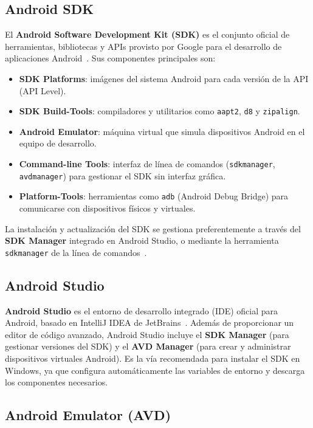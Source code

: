 \documentclass[12pt,a4paper]{article}
\begin{document}
\subsection{Android SDK}

El \textbf{Android Software Development Kit (SDK)} es el conjunto oficial de herramientas, bibliotecas y APIs provisto por Google para el desarrollo de aplicaciones Android~\cite{androiddev2024}. Sus componentes principales son:

\begin{itemize}
  \item \textbf{SDK Platforms}: imágenes del sistema Android para cada versión de la API (API Level).
  \item \textbf{SDK Build-Tools}: compiladores y utilitarios como \texttt{aapt2}, \texttt{d8} y \texttt{zipalign}.
  \item \textbf{Android Emulator}: máquina virtual que simula dispositivos Android en el equipo de desarrollo.
  \item \textbf{Command-line Tools}: interfaz de línea de comandos (\texttt{sdkmanager}, \texttt{avdmanager}) para gestionar el SDK sin interfaz gráfica.
  \item \textbf{Platform-Tools}: herramientas como \texttt{adb} (Android Debug Bridge) para comunicarse con dispositivos físicos y virtuales.
\end{itemize}

La instalación y actualización del SDK se gestiona preferentemente a través del \textbf{SDK Manager} integrado en Android Studio, o mediante la herramienta \texttt{sdkmanager} de la línea de comandos~\cite{androiddev2024}.

\subsection{Android Studio}

\textbf{Android Studio} es el entorno de desarrollo integrado (IDE) oficial para Android, basado en IntelliJ IDEA de JetBrains~\cite{androidstudio2024}. Además de proporcionar un editor de código avanzado, Android Studio incluye el \textbf{SDK Manager} (para gestionar versiones del SDK) y el \textbf{AVD Manager} (para crear y administrar dispositivos virtuales Android). Es la vía recomendada para instalar el SDK en Windows, ya que configura automáticamente las variables de entorno y descarga los componentes necesarios.

\subsection{Android Emulator (AVD)}
\end{document}
